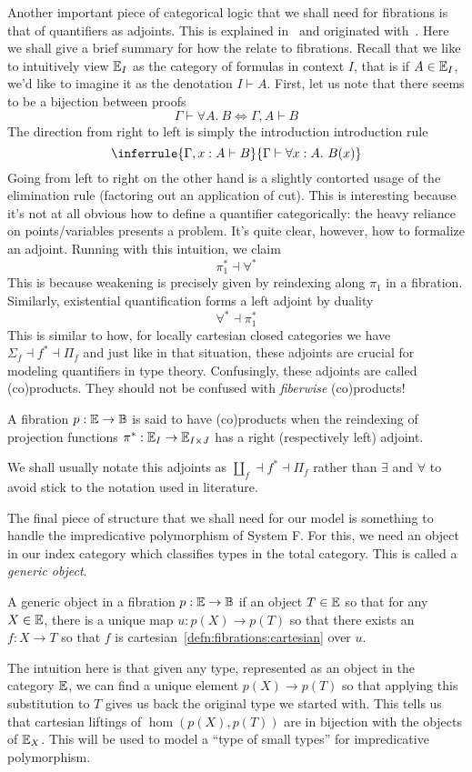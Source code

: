 Another important piece of categorical logic that we shall need for
fibrations is that of quantifiers as adjoints. This is explained
in~\citet{Awodey:06} and originated with~\citet{Lawvere:69}. Here we
shall give a brief summary for how the relate to fibrations. Recall
that we like to intuitively view $\mathbb{E}_I$ as the category of formulas
in context $I$, that is if $A \in \mathbb{E}_I$, we'd like to imagine it as
the denotation $I \vdash A$. First, let us note that there seems to be
a bijection between proofs
\[
  \Gamma \vdash \forall A.\ B \iff \Gamma, A \vdash B
\]
The direction from right to left is simply the introduction
introduction rule
\[
  \inferrule{
    \Gamma, x : A \vdash B
  }{\Gamma \vdash \forall x : A.\ B(x)}
\]
Going from left to right on the other hand is a slightly contorted
usage of the elimination rule (factoring out an application of
cut). This is interesting because it's not at all obvious how to
define a quantifier categorically: the heavy reliance on
points/variables presents a problem. It's quite clear, however, how to
formalize an adjoint. Running with this intuition, we claim
\[
  \pi_1^* \dashv \forall^*
\]
This is because weakening is precisely given by reindexing along
$\pi_1$ in a fibration. Similarly, existential quantification forms a
left adjoint by duality
\[
   \forall^* \dashv \pi_1^*
\]
This is similar to how, for locally cartesian closed categories we
have $\Sigma_f \dashv f^* \dashv \Pi_f$ and just like in that
situation, these adjoints are crucial for modeling quantifiers in
type theory. Confusingly, these adjoints are called (co)products. They
should not be confused with \emph{fiberwise} (co)products!
\begin{defn}\label{defn:fibrations:products}
  A fibration $p : \mathbb{E} \to \mathbb{B}$ is said to have (co)products when
  the reindexing of projection functions
  $\pi^* : \mathbb{E}_I \to \mathbb{E}_{I \times J}$ has a right (respectively
  left) adjoint.
\end{defn}
We shall usually notate this adjoints as
$\amalg_f \dashv f^* \dashv \Pi_f$ rather than $\exists$ and $\forall$
to avoid stick to the notation used in literature.

The final piece of structure that we shall need for our model is
something to handle the impredicative polymorphism of System F. For
this, we need an object in our index category which classifies types
in the total category. This is called a \emph{generic object}.

\begin{defn}\label{defn:fibrations:genericobject}
  A generic object in a fibration $p : \mathbb{E} \to \mathbb{B}$ if an object
  $T \in \mathbb{E}$ so that for any $X \in \mathbb{E}$, there is a unique map
  $u : p(X) \to p(T)$ so that there exists an $f : X \to T$ so that
  $f$ is cartesian~\ref{defn:fibrations:cartesian} over $u$.
\end{defn}

The intuition here is that given any type, represented as an object in
the category $\mathbb{E}$, we can find a unique element $p(X) \to p(T)$ so
that applying this substitution to $T$ gives us back the original type
we started with. This tells us that cartesian liftings of
$\hom(p(X), p(T))$ are in bijection with the objects of
$\mathbb{E}_X$. This will be used to model a ``type of small types'' for
impredicative polymorphism.
